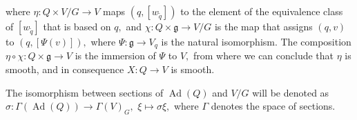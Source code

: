 \documentclass[12pt, letterpaper, reqno]{amsart}
\theoremstyle{definition}
\theoremstyle{plain}
\theoremstyle{remark}
\begin{document}
\begin{center}
\end{center}
where $ \eta: Q\times V/G \rightarrow V $ maps $ (q, [w_{\tilde q}]) $ to the element of the equivalence class of $ [w_{\tilde q}] $ that is based on $ q, $ and $ \chi: Q\times\mathfrak{g}\rightarrow V/G $ is the map that assigns $(q,v)$ to $ (q, [\Psi(v)]), $ where $ \Psi: \mathfrak{g} \rightarrow V_q $ is the natural isomorphism. The composition $ \eta\circ\chi: Q\times \mathfrak{g} \rightarrow V $ is the immersion of $ \Psi $ to $ V, $ from where we can conclude that $ \eta $ is smooth, and in consequence $ X:Q \rightarrow V $ is smooth.

The isomorphism between sections of $ \operatorname{Ad} (Q) $ and $ V/G $ will be denoted as $ \sigma: \Gamma( \operatorname{Ad} (Q)) \rightarrow \Gamma(V)_G, $ $ \xi \mapsto \sigma\xi, $ where $ \Gamma $ denotes the space of sections.
\end{document}
